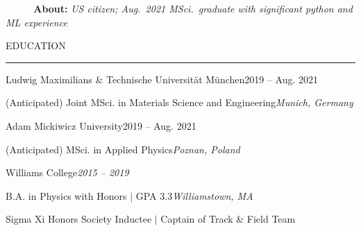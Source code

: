 \documentclass{short_resume} %
\renewenvironment{rSection}[1]{
	\sectionskip
	\textcolor{RoyalPurple}{\MakeUppercase{#1}}
	\sectionlineskip
	\hrule
	\begin{list}{}{
			\setlength{\leftmargin}{1.5em}
		}
		\item[]
	}{
	\end{list}
}
\begin{document}
	\vspace{-1em}
	\hfill \textbf{ ~~~~~About: }\textit{US citizen; Aug.~2021 MSci.~graduate with significant python and ML experience} \hfill
	\vspace{-1em}
	
	\begin{rSection}{Education} 
		\begin{rSubsection}{Ludwig Maximilians \& Technische Universit{\"a}t M{\"u}nchen}{2019 -- Aug. 2021}{}{}
			\vspace{-.2em}
			\item[] {(Anticipated) Joint MSci. in Materials Science and Engineering}\hfill{\em Munich, Germany}
			\end{rSubsection}
		\vspace{-.4em}
		\begin{rSubsection}{Adam Mickiwicz University}{2019 -- Aug. 2021}{}{}
			\vspace{-.2em}
			\item[] {(Anticipated) MSci. in Applied Physics}\hfill{\em Poznan, Poland}
		\end{rSubsection}
	\vspace{-.5em}
		\begin{rSubsection}{Williams College}{\em 2015 -- 2019}{}{}
			\vspace{-.2em}
			\item[] {B.A. in Physics with Honors $\vert$ GPA 3.3}\hfill{\em Williamstown, MA}
			\item[] Sigma Xi Honors Society Inductee $\vert$ Captain of Track \& Field Team	
		\end{rSubsection}
	\end{rSection}
		
\end{document}
